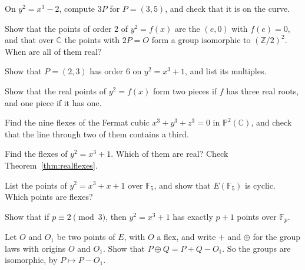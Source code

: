 \begin{exercise}[$\star$]\label{ex:bachet}
On $y^2=x^3-2$, compute $3P$ for $P=(3,5)$, and check that it is on the curve.
\end{exercise}

\begin{exercise}[$\star$]\label{ex:twotorsion}
Show that the points of order $2$ of $y^2=f(x)$ are the $(e,0)$ with $f(e)=0$, and that over $\mathbb C$ the points with $2P=O$ form a group isomorphic to
$(\mathbb Z/2)^2$. When are all of them real?
\end{exercise}

\begin{exercise}[$\star\star$]\label{ex:torsionsix}
Show that $P=(2,3)$ has order $6$ on $y^2=x^3+1$, and list its multiples.
\end{exercise}

\begin{exercise}[$\star$]\label{ex:realcomponents}
Show that the real points of $y^2=f(x)$ form two pieces if $f$ has three real roots, and one piece if it has one.
\end{exercise}

\begin{exercise}[$\star\star$]\label{ex:fermatflexes}
Find the nine flexes of the Fermat cubic $x^3+y^3+z^3=0$ in $\mathbb P^2(\mathbb C)$, and check that the line through two of them contains a third.
\end{exercise}

\begin{exercise}[$\star\star$]\label{ex:flexesxcube}
Find the flexes of $y^2=x^3+1$. Which of them are real? Check Theorem~\ref{thm:realflexes}.
\end{exercise}

\begin{exercise}[$\star$]\label{ex:countfive}
List the points of $y^2=x^3+x+1$ over $\mathbb F_5$, and show that $E(\mathbb F_5)$ is cyclic. Which points are flexes?
\end{exercise}

\begin{exercise}[$\star\star$]\label{ex:xcubeplusone}
Show that if $p\equiv2\pmod3$, then $y^2=x^3+1$ has exactly $p+1$ points over $\mathbb F_p$.
\end{exercise}

\begin{exercise}[$\star\star$]\label{ex:changeorigin}
Let $O$ and $O_1$ be two points of $E$, with $O$ a flex, and write $+$ and $\oplus$ for the group laws with origins $O$ and $O_1$. Show that
$P\oplus Q=P+Q-O_1$. So the groups are isomorphic, by $P\mapsto P-O_1$.
\end{exercise}

